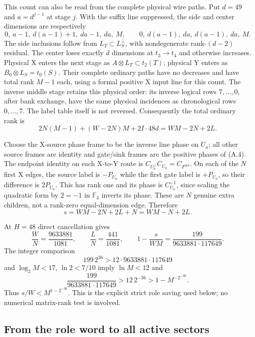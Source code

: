 This count can also be read from the complete physical wire paths.
Put $d=49$ and $a=d^{j-1}$ at stage $j$. With the suffix line
suppressed, the side and center dimensions are respectively
\[
 0,\ a-1,\ d(a-1)+1,\ da-1,\ da,\ M,
 \qquad
 0,\ d(a-1),\ da,\ d(a-1),\ da,\ M .
\]
The side inclusions follow from $L_T\subset L_S^\perp$, with
nondegenerate rank-$(d-2)$ residual. The center loses exactly
$d$ dimensions at $t_3\to t_4$ and otherwise increases.
Physical X enters the next stage as $A\otimes L_T\subset t_2(T)$;
physical Y enters as $B_0\otimes L_S=t_0(S)$.
Their complete ordinary paths have no decreases and have total
rank $M-1$ each, using a formal positive X input line for this count.
The inverse middle stage retains this physical order: its inverse
logical rows $7,\ldots,0$, after bank exchange, have the same physical
incidences as chronological rows $0,\ldots,7$. The label table itself
is not reversed. Consequently the total ordinary rank is
\[
 2N(M-1)+(W-2N)M+2I\cdot48d=WM-2N+2L.
\]

Choose the X-source phase frame to be the inverse line phase on $U_a$;
all other source frames are identity and gate/sink frames are the
positive phases of (A.4). The endpoint identity on each X-to-Y route is
$C_{U_a^\perp}C_{U_a}=C_{F^{\otimes3}}$. On each of the $N$ first X
edges, the source label is $-P_{U_a}$ while the first gate label is
$+P_{U_a}$, so their difference is $2P_{U_a}$. This has rank one and
its phase is $C_{U_a}^{-1}$, since scaling the quadratic form by
$2=-1$ in $\mathbb F_3$ inverts its phase. These are $N$ genuine extra
children, not a rank-zero equal-dimension edge. Therefore
\[
 s=WM-2N+2L+N=WM-N+2L.                                \tag{A.9}
\]

At $H=48$ direct cancellation gives
\[
 \frac WN=\frac{9633881}{1081},\qquad
 \frac LN=\frac{441}{1081},\qquad
 1-\frac{s}{WM}=\frac{199}{9633881\cdot117649}.
                                                               \tag{A.10}
\]
The integer comparison
\[
 199\,2^{36}>12\cdot9633881\cdot117649
\]
and $\log_2 M<17$, $\ln2<7/10$ imply $\ln M<12$ and
\[
 \frac{199}{9633881\cdot117649}>12\,2^{-36}
   >1-M^{-2^{-36}}.
\]
Thus $s/W<M^{1-2^{-36}}$. This is the explicit strict role saving used
below; no numerical matrix-rank test is involved.

\subsection{From the role word to all active sectors}

